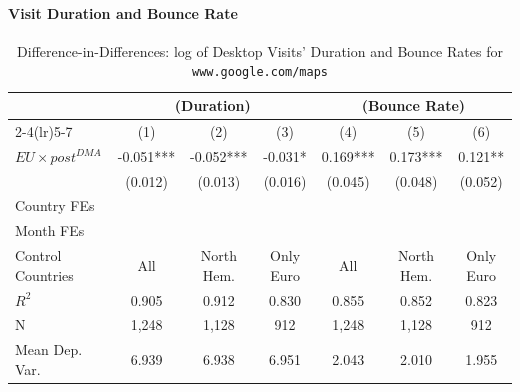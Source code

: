 \documentclass[11pt]{article}
\begin{document}
	\clearpage
	
	\paragraph{Visit Duration and Bounce Rate} 
	
	
	\clearpage
	
	
	
	\begin{table}
		\centering
		\def\sym#1{\ifmmode^{#1}\else\(^{#1}\)\fi}
		\caption{\label{tab:did_duration_bounce} Difference-in-Differences: log of Desktop Visits' Duration and Bounce Rates for \texttt{www.google.com/maps}}
		\begin{threeparttable}
			\begin{tabular}{lcccccc}
				\hline \noalign{\smallskip} 
				& \multicolumn{3}{c}{(Duration)} & \multicolumn{3}{c}{(Bounce Rate)}  \\ \cmidrule(lr){2-4}\cmidrule(lr){5-7}
				
				&         (1)   &         (2)   &         (3)   &         (4)   &         (5)   &         (6)   \\
				\midrule
				$ EU \times post^{DMA} $ &      -0.051***&      -0.052***&      -0.031*  &       0.169***&       0.173***&       0.121** \\
				&     (0.012)   &     (0.013)   &     (0.016)   &     (0.045)   &     (0.048)   &     (0.052)   \\
				
				Country FEs         &  \checkmark   &  \checkmark   &  \checkmark   &  \checkmark   &  \checkmark   &  \checkmark   \\
				Month FEs           &  \checkmark   &  \checkmark   &  \checkmark   &  \checkmark   &  \checkmark   &  \checkmark   \\
				Control Countries   &         All   &  North Hem.   &   Only Euro   &         All   &  North Hem.   &   Only Euro   \\
				$ R ^2 $            &       0.905   &       0.912   &       0.830   &       0.855   &       0.852   &       0.823   \\
				N                   &       1,248   &       1,128   &         912   &       1,248   &       1,128   &         912   \\
				Mean Dep. Var.      &       6.939   &       6.938   &       6.951   &       2.043   &       2.010   &       1.955   \\
				\midrule
			\end{tabular}
			

\end{threeparttable}
\end{table}
\end{document}

